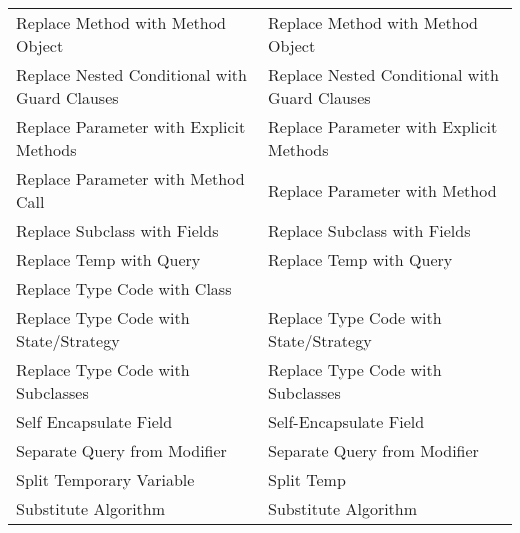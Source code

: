 \documentclass[11pt,a4paper,oneside]{book}
\begin{document}
\begin{longtable}{|p{200pt}|p{200pt}|}
    Replace Method with Method Object & Replace Method with Method Object\\ 
    Replace Nested Conditional with Guard Clauses & Replace Nested Conditional with Guard Clauses\\ 
    Replace Parameter with Explicit Methods & Replace Parameter with Explicit Methods\\ 
    Replace Parameter with Method Call & Replace Parameter with Method\\ 
    Replace Subclass with Fields & Replace Subclass with Fields\\ 
    Replace Temp with Query & Replace Temp with Query\\ 
    Replace Type Code with Class & \\ 
    Replace Type Code with State/Strategy & Replace Type Code with State/Strategy\\ 
    Replace Type Code with Subclasses & Replace Type Code with Subclasses\\ 
    Self Encapsulate Field & Self-Encapsulate Field\\ 
    Separate Query from Modifier & Separate Query from Modifier\\ 
    Split Temporary Variable & Split Temp\\ 
    Substitute Algorithm &     Substitute Algorithm\\
\end{longtable}
\end{document}
